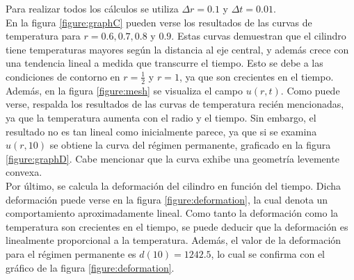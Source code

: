 \documentclass[journal, monochrome]{IEEEtran}
\begin{document}
Para realizar todos los cálculos se utiliza $\Delta r = 0.1$ y $\Delta t = 0.01$. \\

En la figura \ref{figure:graphC} pueden verse los resultados de las curvas de temperatura para $ r = 0.6,0.7,0.8 $ y $0.9$. Estas curvas demuestran que el cilindro tiene temperaturas mayores según la distancia al eje central, y además crece con una tendencia lineal a medida que transcurre el tiempo. Esto se debe a las condiciones de contorno en $r=\frac{1}{2}$ y $r=1$, ya que son crecientes en el tiempo. \\

Además, en la figura \ref{figure:mesh} se visualiza el campo $u(r,t)$. Como puede verse, respalda los resultados de las curvas de temperatura recién mencionadas, ya que la temperatura aumenta con el radio y el tiempo. Sin embargo, el resultado no es tan lineal como inicialmente parece, ya que si se examina $u(r,10)$ se obtiene la curva del régimen permanente, graficado en la figura \ref{figure:graphD}. Cabe mencionar que la curva exhibe una geometría levemente convexa. \\

Por último, se calcula la deformación del cilindro en función del tiempo. Dicha deformación puede verse en la figura \ref{figure:deformation}, la cual denota un comportamiento aproximadamente lineal. Como tanto la deformación como la temperatura son crecientes en el tiempo, se puede deducir que la deformación es linealmente proporcional a la temperatura. Además, el valor de la deformación para el régimen permanente es $d(10) = 1242.5$, lo cual se confirma con el gráfico de la figura \ref{figure:deformation}. \\
\end{document}
